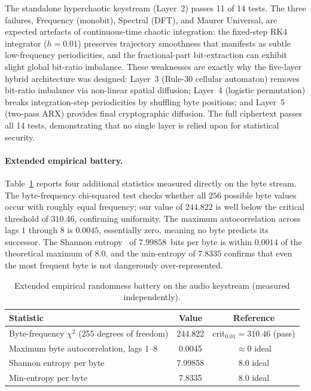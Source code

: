 \documentclass[pdflatex,sn-mathphys-num]{sn-jnl}%
\theoremstyle{thmstyleone}%
\theoremstyle{thmstyletwo}%
\theoremstyle{thmstylethree}%
\begin{document}
The standalone hyperchaotic keystream (Layer~2) passes 11 of 14 tests. 
The three failures, Frequency (monobit), Spectral (DFT), and Maurer
Universal, are expected artefacts of continuous-time chaotic integration: 
the fixed-step RK4 integrator ($h=0.01$) preserves trajectory smoothness 
that manifests as subtle low-frequency periodicities, and the fractional-part 
bit-extraction can exhibit slight global bit-ratio imbalance. These weaknesses 
are exactly why the five-layer hybrid architecture was designed: Layer~3 
(Rule-30 cellular automaton) removes bit-ratio imbalance via non-linear 
spatial diffusion; Layer~4 (logistic permutation) breaks integration-step 
periodicities by shuffling byte positions; and Layer~5 (two-pass ARX) 
provides final cryptographic diffusion. The full ciphertext passes all 14 
tests, demonstrating that no single layer is relied upon for statistical 
security.

\paragraph{Extended empirical battery.} Table~\ref{tab:ext} reports four additional statistics measured directly on the byte stream. The byte-frequency chi-squared test checks whether all $256$ possible byte values occur with roughly equal frequency; our value of $244.822$ is well below the critical threshold of $310.46$, confirming uniformity. The maximum autocorrelation across lags $1$ through $8$ is $0.0045$, essentially zero, meaning no byte predicts its successor. The Shannon entropy~\cite{shannon1948} of $7.99858$~bits per byte is within $0.0014$ of the theoretical maximum of $8.0$, and the min-entropy of $7.8335$ confirms that even the most frequent byte is not dangerously over-represented.

\begin{table}[htbp]
\centering
\caption{Extended empirical randomness battery on the audio keystream (measured independently).}
\label{tab:ext}
\small
\begin{tabular}{lcc}
\toprule
\textbf{Statistic} & \textbf{Value} & \textbf{Reference} \\
\midrule
Byte-frequency $\chi^2$ (255 degrees of freedom) & 244.822 & crit$_{0.01}=310.46$ (pass) \\
Maximum byte autocorrelation, lags 1--8 & 0.0045 & $\approx 0$ ideal \\
Shannon entropy per byte & 7.99858 & 8.0 ideal \\
Min-entropy per byte & 7.8335 & 8.0 ideal \\
\bottomrule
\end{tabular}
\end{table}
\end{document}
